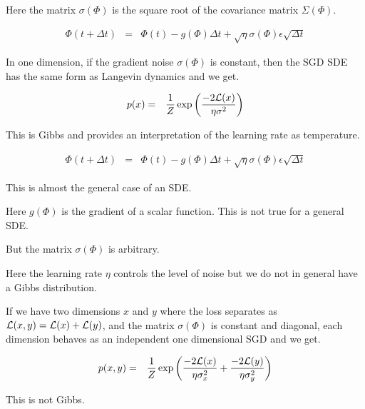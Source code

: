 {\vfill
Here the matrix $\sigma(\Phi)$ is the square root of the covariance matrix $\Sigma(\Phi)$.


\begin{eqnarray*}
\Phi(t + \Delta t) & = & \Phi(t) -g(\Phi)\Delta t + \sqrt{\eta} \sigma(\Phi) \epsilon\sqrt{\Delta t}
\end{eqnarray*}

\vfill
In one dimension, if the gradient noise $\sigma(\Phi)$ is constant, then the SGD SDE has the same form as Langevin dynamics and we get.

\begin{eqnarray*}
p(x) & = & \frac{1}{Z} \exp\left(\frac{-2{\cal L}(x)}{ \eta \sigma^2}\right)
\end{eqnarray*}

\vfill
This is Gibbs and provides an interpretation of the learning rate as temperature.



\begin{eqnarray*}
\Phi(t + \Delta t) & = & \Phi(t) -g(\Phi)\Delta t + \sqrt{\eta} \sigma(\Phi) \epsilon\sqrt{\Delta t}
\end{eqnarray*}

\vfill
This is almost the general case of an SDE.

\vfill
Here $g(\Phi)$ is the gradient of a scalar function.  This is not true for a general SDE.

\vfill
But the matrix $\sigma(\Phi)$ is arbitrary.

\vfill
Here the learning rate $\eta$ controls the level of noise but we do not in general have a Gibbs distribution.



If we have two dimensions $x$ and $y$ where the loss separates as ${\cal L}(x,y) = {\cal L}(x) + {\cal L}(y)$, and the matrix $\sigma(\Phi)$ is constant and diagonal,
each dimension behaves as an independent one dimensional SGD and we get.

\begin{eqnarray*}
p(x,y) & = & \frac{1}{Z} \exp\left(\frac{-2{\cal L}(x)}{ \eta \sigma_x^2} + \frac{-2{\cal L}(y)}{\eta \sigma_y^2}\right)
\end{eqnarray*}

\vfill
This is not Gibbs.


}

